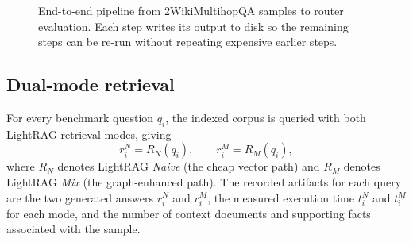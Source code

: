 \documentclass[english, bibtex]{kththesis}               %
\numberwithin{listing}{chapter}
\begin{document}
\begin{figure}[!ht]
\centering
{}
\caption{End-to-end pipeline from 2WikiMultihopQA samples to router evaluation. Each step writes its output to disk so the remaining steps can be re-run without repeating expensive earlier steps.}
\label{fig:methodPipeline}
\end{figure}

\subsection{Dual-mode retrieval}
\label{sec:methodDualMode}

For every benchmark question \(q_i\), the indexed corpus is queried with both LightRAG retrieval modes, giving
\begin{equation}
\label{eq:dualModeOutputs}
r_i^{N} = R_N(q_i),
\qquad
r_i^{M} = R_M(q_i),
\end{equation}
where \(R_N\) denotes LightRAG \emph{Naive} (the cheap vector path) and \(R_M\) denotes LightRAG \emph{Mix} (the graph-enhanced path). The recorded artifacts for each query are the two generated answers \(r_i^N\) and \(r_i^M\), the measured execution time \(t_i^N\) and \(t_i^M\) for each mode, and the number of context documents and supporting facts associated with the sample.
\end{document}
